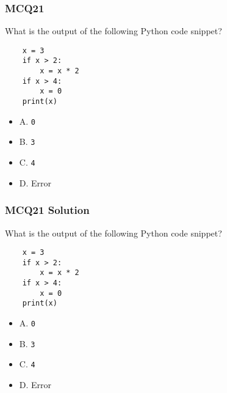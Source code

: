 \documentclass{beamer}
\begin{document}
\begin{frame}[fragile]
    \frametitle{MCQ21}
    What is the output of the following Python code snippet?
    \begin{verbatim}
    x = 3
    if x > 2:
        x = x * 2
    if x > 4:
        x = 0
    print(x)
    \end{verbatim}
    \begin{itemize}
        \item A. \texttt{0}
        \item B. \texttt{3}
        \item C. \texttt{4}
        \item D. Error
    \end{itemize}
\end{frame}
\begin{frame}[fragile]
    \frametitle{MCQ21 Solution}
    What is the output of the following Python code snippet?
    \begin{verbatim}
    x = 3
    if x > 2:
        x = x * 2
    if x > 4:
        x = 0
    print(x)
    \end{verbatim}
    \begin{itemize}
        \item \alert{A. \texttt{0}}
        \item B. \texttt{3}
        \item C. \texttt{4}
        \item D. Error
    \end{itemize}
\end{frame}
\end{document}
